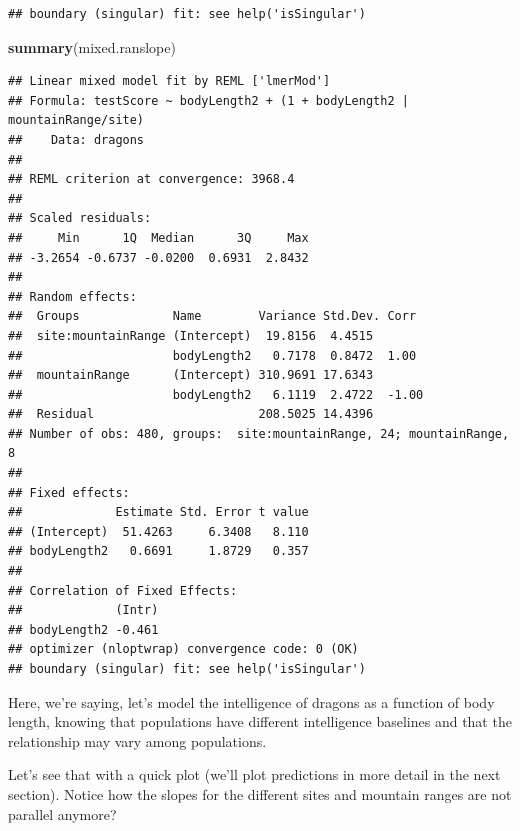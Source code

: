 \documentclass[
]{article}
\newenvironment{Shaded}{\begin{snugshade}}{\end{snugshade}}
\newcommand{\FunctionTok}[1]{\textcolor[rgb]{0.13,0.29,0.53}{\textbf{#1}}}
\newcommand{\NormalTok}[1]{#1}
\begin{document}
\begin{verbatim}
## boundary (singular) fit: see help('isSingular')
\end{verbatim}

\begin{Shaded}
\begin{Highlighting}[]
\FunctionTok{summary}\NormalTok{(mixed.ranslope)}
\end{Highlighting}
\end{Shaded}

\begin{verbatim}
## Linear mixed model fit by REML ['lmerMod']
## Formula: testScore ~ bodyLength2 + (1 + bodyLength2 | mountainRange/site)
##    Data: dragons
## 
## REML criterion at convergence: 3968.4
## 
## Scaled residuals: 
##     Min      1Q  Median      3Q     Max 
## -3.2654 -0.6737 -0.0200  0.6931  2.8432 
## 
## Random effects:
##  Groups             Name        Variance Std.Dev. Corr 
##  site:mountainRange (Intercept)  19.8156  4.4515       
##                     bodyLength2   0.7178  0.8472  1.00 
##  mountainRange      (Intercept) 310.9691 17.6343       
##                     bodyLength2   6.1119  2.4722  -1.00
##  Residual                       208.5025 14.4396       
## Number of obs: 480, groups:  site:mountainRange, 24; mountainRange, 8
## 
## Fixed effects:
##             Estimate Std. Error t value
## (Intercept)  51.4263     6.3408   8.110
## bodyLength2   0.6691     1.8729   0.357
## 
## Correlation of Fixed Effects:
##             (Intr)
## bodyLength2 -0.461
## optimizer (nloptwrap) convergence code: 0 (OK)
## boundary (singular) fit: see help('isSingular')
\end{verbatim}

Here, we're saying, let's model the intelligence of dragons as a
function of body length, knowing that populations have different
intelligence baselines and that the relationship may vary among
populations.

Let's see that with a quick plot (we'll plot predictions in more detail
in the next section). Notice how the slopes for the different sites and
mountain ranges are not parallel anymore?
\end{document}

